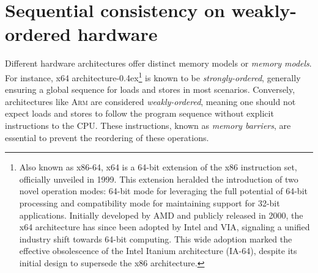 \documentclass[fontsize=10pt, oneside]{scrartcl}
\newcommand{\punckern}{\kern-0.4ex}
\newcommand{\introduce}[1]{\textit{#1}}
\begin{document}
\section{Sequential consistency on weakly-ordered hardware}

Different hardware architectures offer distinct memory models or \introduce{memory models}.
For instance, x64 architecture\punckern\footnote{%
Also known as x86-64, x64 is a 64-bit extension of the x86 instruction set, officially unveiled in 1999.
This extension heralded the introduction of two novel operation modes:
64-bit mode for leveraging the full potential of 64-bit processing and compatibility mode for maintaining support for 32-bit applications.
Initially developed by AMD and publicly released in 2000, the x64 architecture has since been adopted by Intel and VIA,
signaling a unified industry shift towards 64-bit computing.
This wide adoption marked the effective obsolescence of the Intel Itanium architecture (IA-64),
despite its initial design to supersede the x86 architecture.
} is known to be \introduce{strongly-ordered},
generally ensuring a global sequence for loads and stores in most scenarios.
Conversely, architectures like \textsc{Arm} are considered \introduce{weakly-ordered},
meaning one should not expect loads and stores to follow the program sequence without explicit instructions to the \textsc{CPU}.
These instructions, known as \introduce{memory barriers}, are essential to prevent the reordering of these operations.
\end{document}
